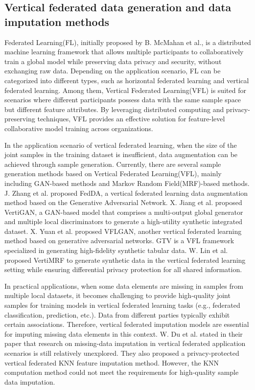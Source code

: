 \documentclass[final,1p,times]{elsarticle}
\begin{document}
\subsection{Vertical federated data generation and data imputation methods}
\label{subsec23}

Federated Learning(FL), initially proposed by B. McMahan et al.\cite{29}, is a distributed machine learning framework that allows multiple participants to collaboratively train a global model while preserving data privacy and security, without exchanging raw data. Depending on the application scenario, FL can be categorized into different types, such as horizontal federated learning and vertical federated learning. Among them, Vertical Federated Learning(VFL)\cite{30} is suited for scenarios where different participants possess data with the same sample space but different feature attributes. By leveraging distributed computing and privacy-preserving techniques, VFL provides an effective solution for feature-level collaborative model training across organizations.

In the application scenario of vertical federated learning, when the size of the joint samples in the training dataset is insufficient, data augmentation can be achieved through sample generation. Currently, there are several sample generation methods based on Vertical Federated Learning(VFL), mainly including GAN-based methods and Markov Random Field(MRF)-based methods. J. Zhang et al.\cite{2} proposed FedDA, a vertical federated learning data augmentation method based on the Generative Adversarial Network. X. Jiang et al.\cite{3} proposed VertiGAN, a GAN-based model that comprises a multi-output global generator and multiple local discriminators to generate a high-utility synthetic integrated dataset. X. Yuan et al.\cite{4} proposed VFLGAN, another vertical federated learning method based on generative adversarial networks. GTV\cite{5} is a VFL framework specialized in generating high-fidelity synthetic tabular data. W. Lin et al.\cite{6} proposed VertiMRF to generate synthetic data in the vertical federated learning setting while ensuring differential privacy protection for all shared information.

In practical applications, when some data elements are missing in samples from multiple local datasets, it becomes challenging to provide high-quality joint samples for training models in vertical federated learning tasks (e.g., federated classification, prediction, etc.). Data from different parties typically exhibit certain associations. Therefore, vertical federated imputation models are essential for imputing missing data elements in this context. W. Du et al.\cite{31} stated in their paper that research on missing-data imputation in vertical federated application scenarios is still relatively unexplored. They also proposed a privacy-protected vertical federated KNN feature imputation method. However, the KNN computation method could not meet the requirements for high-quality sample data imputation.
\end{document}

